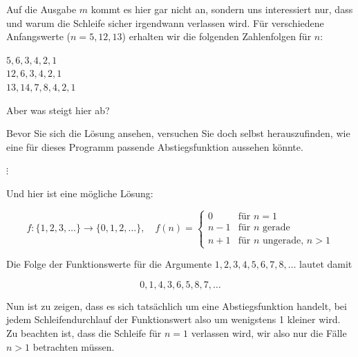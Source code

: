\pagebreak %

Auf die Ausgabe $m$ kommt es hier gar nicht an, sondern uns interessiert nur, dass und warum die Schleife sicher irgendwann verlassen wird. Für verschiedene Anfangswerte ($n = 5, 12, 13$) erhalten wir die folgenden Zahlenfolgen für $n$:

\begin{center}
	$5, 6, 3, 4, 2, 1$ \\
	$12, 6, 3, 4, 2, 1$ \\
	$13, 14, 7, 8, 4, 2, 1$
\end{center}

Aber was steigt hier ab?

Bevor Sie sich die Lösung ansehen, versuchen Sie doch selbst herauszufinden, wie eine für dieses Programm passende Abstiegsfunktion aussehen könnte.

$\vdots$

Und hier ist eine mögliche Lösung:

$$ f: \{1,2,3, \ldots\} \rightarrow \{0,1,2, \ldots \}, \quad f(n) =
\begin{cases}
	0 & \text{für } n = 1 \\
	n - 1 & \text{für } n \text{ gerade} \\
	n + 1 & \text{für } n \text{ ungerade, } n > 1
\end{cases}$$


Die Folge der Funktionswerte für die Argumente $1,2,3,4,5,6,7,8, \ldots$ lautet damit

$$ 0,1,4,3,6,5,8,7, \ldots $$

Nun ist zu zeigen, dass es sich tatsächlich um eine Abstiegsfunktion handelt, bei jedem Schleifendurchlauf der Funktionswert also um wenigstens 1 kleiner wird. Zu beachten ist, dass die Schleife für $n= 1$ verlassen wird, wir also nur die Fälle $n > 1$ betrachten müssen.

\vspace{\baselineskip}


